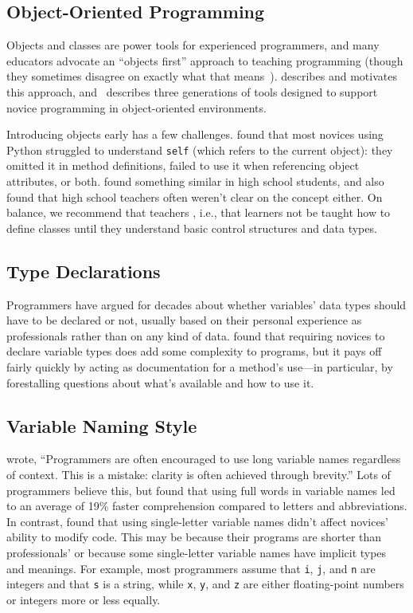 \subsection*{Object-Oriented Programming}

Objects and classes are power tools for experienced programmers,
and many educators advocate an ``objects first'' approach to teaching programming
(though they sometimes disagree on exactly what that means~\cite{Benn2007b}).
\cite{Sorv2014} describes and motivates this approach,
and~\cite{Koll2015} describes three generations of tools
designed to support novice programming in object-oriented environments.

Introducing objects early has a few challenges.
\cite{Mill2016b} found that most novices using Python struggled to understand \texttt{self}
(which refers to the current object):
they omitted it in method definitions,
failed to use it when referencing object attributes,
or both.
\cite{Rago2017} found something similar in high school students,
and also found that high school teachers often weren't clear on the concept either.
On balance,
we recommend that teachers ,
i.e.,
that learners not be taught how to define classes
until they understand basic control structures and data types.

\subsection*{Type Declarations}

Programmers have argued for decades about whether variables' data types should have to be declared or not,
usually based on their personal experience as professionals
rather than on any kind of data.
\cite{Endr2014,Fisc2015} found that requiring novices to declare variable types does add some complexity to programs,
but it pays off fairly quickly by acting as documentation for a method's use---in particular,
by forestalling questions about what's available and how to use it.

\subsection*{Variable Naming Style}

\cite{Kern1999} wrote,
``Programmers are often encouraged to use long variable names regardless of context.
This is a mistake: clarity is often achieved through brevity.''
Lots of programmers believe this,
but \cite{Hofm2017} found that using full words in variable names
led to an average of 19\% faster comprehension compared to letters and abbreviations.
In contrast,
\cite{Beni2017} found that using single-letter variable names didn't affect novices' ability to modify code.
This may be because their programs are shorter than professionals'
or because some single-letter variable names have implicit types and meanings.
For example,
most programmers assume that \texttt{i}, \texttt{j}, and \texttt{n} are integers
and that \texttt{s} is a string,
while \texttt{x}, \texttt{y}, and \texttt{z} are either floating-point numbers or integers
more or less equally.

